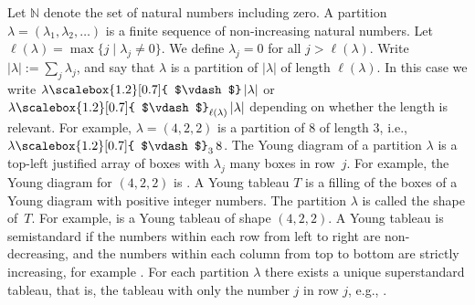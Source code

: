 \documentclass[10pt,a4paper]{article}
\begin{document}
Let $\mathbb{N}$ denote the set of natural numbers including zero.
A partition $\lambda=(\lambda_{1},\lambda_{2},\ldots)$ is a finite sequence of non-increasing natural numbers.
Let $\ell(\lambda)=\max\{j\mid\lambda_{j}\neq 0\}$. We define $\lambda_{j}=0$ for all $j>\ell(\lambda)$.
Write $|\lambda|:=\sum_{j}\lambda_{j}$, and say that $\lambda$ is a partition of $|\lambda|$ of length $\ell(\lambda)$. In this case we write $\lambda\mathchoice{\scalebox{1.2}[0.7]{ $\vdash$}\,}{\scalebox{1.2}[0.7]{ $\vdash$}\,}{\scalebox{0.7}{\scalebox{1.2}[0.7]{$\vdash$}}\,}{\scalebox{0.5}{\scalebox{1.2}[0.7]{$\vdash$}}\,}|\lambda|$ or $\lambda\mathchoice{\scalebox{1.2}[0.7]{ $\vdash$}_{\ell(\lambda)}\,}{\scalebox{1.2}[0.7]{ $\vdash$}_{\ell(\lambda)}\,}{\scalebox{0.7}{\scalebox{1.2}[0.7]{$\vdash$}}_{\ell(\lambda)}\,}{\scalebox{0.5}{\scalebox{1.2}[0.7]{$\vdash$}}_{\ell(\lambda)}\,}|\lambda|$ depending on whether the length is relevant. For example, $\lambda=(4,2,2)$ is a partition of $8$ of length $3$, i.e., $\lambda\mathchoice{\scalebox{1.2}[0.7]{ $\vdash$}_{3}\,}{\scalebox{1.2}[0.7]{ $\vdash$}_{3}\,}{\scalebox{0.7}{\scalebox{1.2}[0.7]{$\vdash$}}_{3}\,}{\scalebox{0.5}{\scalebox{1.2}[0.7]{$\vdash$}}_{3}\,}8$.
The Young diagram of a partition $\lambda$ is a top-left justified array of boxes with $\lambda_{j}$ many boxes in row $j$. For example, the Young diagram for $(4,2,2)$ is 
. A Young tableau $T$ is a filling of the boxes of a Young diagram with positive integer numbers. The partition $\lambda$ is called the shape of $T$. For example, 
is a Young tableau of shape $(4,2,2)$. A Young tableau is semistandard if the numbers within each row from left to right are non-decreasing, and the numbers within each column from top to bottom are strictly increasing, for example 
.
For each partition $\lambda$ there exists a unique superstandard tableau, that is, the tableau with only the number $j$ in row $j$, e.g., 
.
\end{document}
